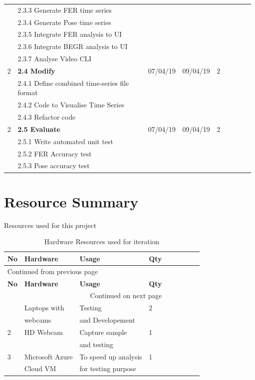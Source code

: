\documentclass[12pt,a4paper,man]{report}
\begin{document}
\begin{longtable}{|l|l|l|l|l|l|l|lp{3cm}|}
 & 2.3.3 Generate FER time series &  &  & \\
 & 2.3.4 Generate Pose time series &  &  & \\
 & 2.3.5 Integrate FER analysis to UI &  &  & \\
 & 2.3.6 Integrate BEGR analysis to UI &  &  & \\
 & 2.3.7 Analyse Video CLI &  &  & \\
\hline
2 & \textbf{2.4 Modify} & 07/04/19 & 09/04/19 & 2\\
 & 2.4.1 Define combined time-series file format &  &  & \\
 & 2.4.2 Code to Visualise Time Series &  &  & \\
 & 2.4.3 Refactor code &  &  & \\
\hline
2 & \textbf{2.5 Evaluate} & 07/04/19 & 09/04/19 & 2\\
 & 2.5.1 Write automated unit test &  &  & \\
 & 2.5.2 FER Accuracy test &  &  & \\
 & 2.5.3 Pose accuracy test &  &  & \\
\hline
\end{longtable}


\section{Resource Summary}
\label{sec:org8965d66}
Resources used for this project
\begin{longtable}{|l|l|l|l|l|l|l|lp{3cm}|}
\caption{\label{table: hard_ressumm}
Hardware Resources used for iteration}
\\
\hline
\textbf{No} & \textbf{Hardware} & \textbf{Usage} & \textbf{Qty}\\
\hline
\endfirsthead
\multicolumn{4}{l}{Continued from previous page} \\
\hline

\textbf{No} & \textbf{Hardware} & \textbf{Usage} & \textbf{Qty} \\

\hline
\endhead
\hline\multicolumn{4}{r}{Continued on next page} \\
\endfoot
\endlastfoot
\hline
1 & Laptops with & Testing & 2\\
 & webcams & and Developement & \\
\hline
2 & HD Webcam & Capture sample & 1\\
 &  & and testing & \\
\hline
3 & Microsoft Azure & To speed up analysis & 1\\
 & Cloud VM & for testing purpose & \\
\hline
\end{longtable}
\end{document}
